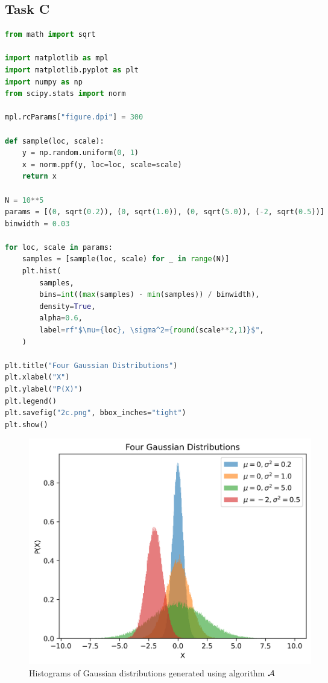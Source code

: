 \subsection*{Task C}
\begin{lstlisting}[language=Python, caption={Python code to implement algorithm $\cal{A}$ and plot their histograms}, label=lst:gaussian-algo]
from math import sqrt

import matplotlib as mpl
import matplotlib.pyplot as plt
import numpy as np
from scipy.stats import norm

mpl.rcParams["figure.dpi"] = 300

def sample(loc, scale):
    y = np.random.uniform(0, 1)
    x = norm.ppf(y, loc=loc, scale=scale)
    return x

N = 10**5
params = [(0, sqrt(0.2)), (0, sqrt(1.0)), (0, sqrt(5.0)), (-2, sqrt(0.5))]
binwidth = 0.03

for loc, scale in params:
    samples = [sample(loc, scale) for _ in range(N)]
    plt.hist(
        samples,
        bins=int((max(samples) - min(samples)) / binwidth),
        density=True,
        alpha=0.6,
        label=rf"$\mu={loc}, \sigma^2={round(scale**2,1)}$",
    )

plt.title("Four Gaussian Distributions")
plt.xlabel("X")
plt.ylabel("P(X)")
plt.legend()
plt.savefig("2c.png", bbox_inches="tight")
plt.show()
\end{lstlisting}
\begin{figure}[H]
	\centering
	\includegraphics[width=0.6\textwidth]{img/2c.png}
	\caption{Histograms of Gaussian distributions generated using algorithm $\cal{A}$}
\end{figure}

